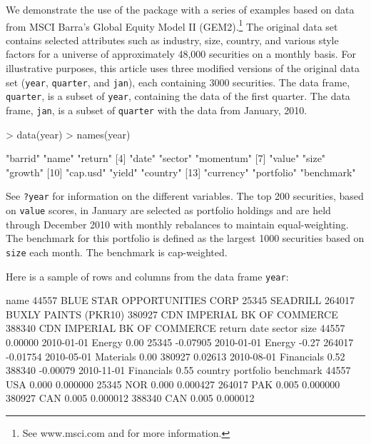 We demonstrate the use of the  package with a series of
examples based on data from MSCI Barra's Global Equity Model II
(GEM2).\footnote{See www.msci.com and \cite{gem2} for more
  information.} The original data set contains selected attributes
such as industry, size, country, and various style factors for a
universe of approximately 48,000 securities on a monthly basis. For
illustrative purposes, this article uses three modified versions of
the original data set (\texttt{year}, \texttt{quarter}, and
\texttt{jan}), each containing 3000 securities.  The data frame,
\texttt{quarter}, is a subset of \texttt{year}, containing the data of
the first quarter. The data frame, \texttt{jan}, is a subset of
\texttt{quarter} with the data from January, 2010.


\begin{Schunk}
\begin{Sinput}
> data(year)
> names(year)
\end{Sinput}
\begin{Soutput}
 [1] "barrid"    "name"      "return"   
 [4] "date"      "sector"    "momentum" 
 [7] "value"     "size"      "growth"   
[10] "cap.usd"   "yield"     "country"  
[13] "currency"  "portfolio" "benchmark"
\end{Soutput}
\end{Schunk}

See \texttt{?year} for information on the different variables. 
The top 200 securities, based on \texttt{value} scores,
  in January are selected as portfolio holdings and are held through
  December 2010 with monthly rebalances to maintain equal-weighting.
  The benchmark for this portfolio is defined as the largest 1000 
  securities based on \texttt{size} each month. The
  benchmark is cap-weighted.

Here is a sample of rows and columns from the data frame
\texttt{year}:

\begin{Schunk}
\begin{Soutput}
                                      name
44557  BLUE STAR OPPORTUNITIES CORP       
25345  SEADRILL                           
264017 BUXLY PAINTS (PKR10)               
380927 CDN IMPERIAL BK OF COMMERCE        
388340 CDN IMPERIAL BK OF COMMERCE        
         return       date     sector  size
44557   0.00000 2010-01-01     Energy  0.00
25345  -0.07905 2010-01-01     Energy -0.27
264017 -0.01754 2010-05-01  Materials  0.00
380927  0.02613 2010-08-01 Financials  0.52
388340 -0.00079 2010-11-01 Financials  0.55
       country portfolio benchmark
44557      USA     0.000  0.000000
25345      NOR     0.000  0.000427
264017     PAK     0.005  0.000000
380927     CAN     0.005  0.000012
388340     CAN     0.005  0.000012
\end{Soutput}
\end{Schunk}

